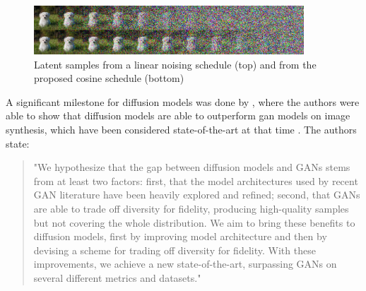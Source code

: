 \begin{figure}[h]
    \centering
    \includegraphics[width=0.9\textwidth]{images/cosine.png}
    \caption[Noising Schedule]{Latent samples from a linear noising schedule (top) and from the proposed cosine schedule (bottom) \cite[Figure 3, p. 4]{nichol2021ImprovedDenoisingDiffusion}}
    \label{fig:cosine}
\end{figure}

A significant milestone for diffusion models was done by \textcite{dhariwal2021DiffusionModelsBeat}, where the authors were able to show that diffusion models are able to outperform \gls{gan}
models on image synthesis, which have been considered state-of-the-art at that time \cite{dhariwal2021DiffusionModelsBeat}.
The authors state:

\begin{quotation}
    "We hypothesize that the gap between diffusion models and GANs stems from at least two factors: 
    first, that the \gls{model} architectures used by recent GAN literature have been heavily explored and refined; 
    second, that GANs are able to trade off diversity for fidelity, producing high-quality samples but not covering the whole distribution. 
    We aim to bring these benefits to diffusion models, first by improving \gls{model} architecture and then by devising a scheme for trading off diversity for fidelity. 
    With these improvements, we achieve a new state-of-the-art, surpassing GANs on several different metrics and datasets." \cite[p. 2]{dhariwal2021DiffusionModelsBeat}
\end{quotation}


